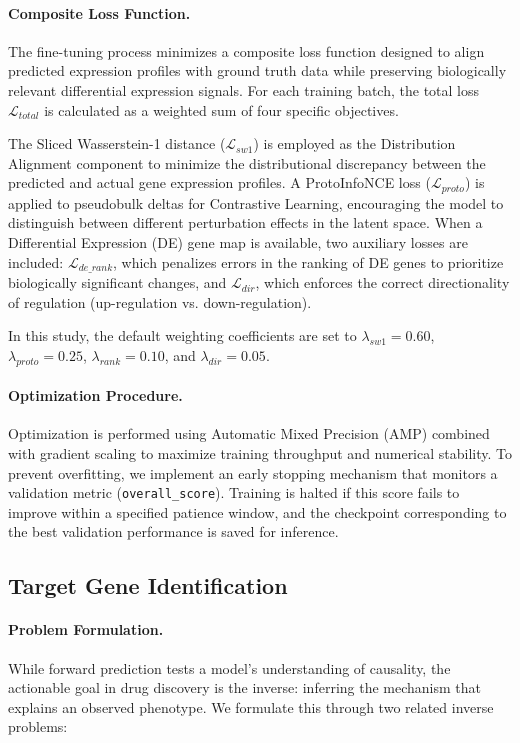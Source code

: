 \documentclass{article}
\begin{document}
\paragraph{Composite Loss Function.}
The fine-tuning process minimizes a composite loss function designed to align predicted expression profiles with ground truth data while preserving biologically relevant differential expression signals. For each training batch, the total loss $\mathcal{L}_{total}$ is calculated as a weighted sum of four specific objectives.

The Sliced Wasserstein-1 distance ($\mathcal{L}_{sw1}$) is employed as the Distribution Alignment component to minimize the distributional discrepancy between the predicted and actual gene expression profiles. A ProtoInfoNCE loss ($\mathcal{L}_{proto}$) is applied to pseudobulk deltas for Contrastive Learning, encouraging the model to distinguish between different perturbation effects in the latent space. When a Differential Expression (DE) gene map is available, two auxiliary losses are included: $\mathcal{L}_{de\_rank}$, which penalizes errors in the ranking of DE genes to prioritize biologically significant changes, and $\mathcal{L}_{dir}$, which enforces the correct directionality of regulation (up-regulation vs. down-regulation).

In this study, the default weighting coefficients are set to $\lambda_{sw1}=0.60$, $\lambda_{proto}=0.25$, $\lambda_{rank}=0.10$, and $\lambda_{dir}=0.05$.

\paragraph{Optimization Procedure.}
Optimization is performed using Automatic Mixed Precision (AMP) combined with gradient scaling to maximize training throughput and numerical stability. To prevent overfitting, we implement an early stopping mechanism that monitors a validation metric (\texttt{overall\_score}). Training is halted if this score fails to improve within a specified patience window, and the checkpoint corresponding to the best validation performance is saved for inference.



\subsection{Target Gene Identification}\label{sec:target_id_methods}

\paragraph{Problem Formulation.}
While forward prediction tests a model's understanding of causality, the actionable goal in drug discovery is the inverse: inferring the mechanism that explains an observed phenotype. We formulate this through two related inverse problems:
\end{document}
